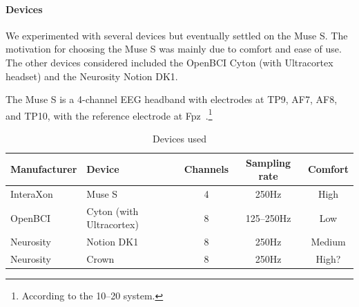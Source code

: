         \paragraph{Devices}

            We experimented with several devices but eventually settled on the Muse S. The motivation for choosing the Muse S was mainly due to comfort and ease of use. The other devices considered included the OpenBCI Cyton (with Ultracortex headset) and the Neurosity Notion DK1.

            The Muse S is a 4-channel EEG headband with electrodes at TP9, AF7, AF8, and TP10, with the reference electrode at Fpz~\cite{krigolson_choosing_2017}.\footnote{According to the 10--20 system.}

            \begin{widepage}
            \begin{table}
                \begin{tabular}{llccc}
                    \toprule
                    Manufacturer
                    & Device
                    & Channels
                    & Sampling rate
                    & Comfort
                    \\ 
                    \midrule
                    InteraXon
                    & Muse S
                    & 4
                    & 250Hz
                    & High \\
                 OpenBCI
                    & Cyton (with Ultracortex)
                    & 8
                    & 125--250Hz
                    & Low \\
                 Neurosity
                    & Notion DK1
                    & 8
                    & 250Hz
                    & Medium \\
                  Neurosity
                    & Crown
                    & 8
                    & 250Hz
                    & High? \\
                    \bottomrule
                \end{tabular}
                \caption{Devices used}\label{table:devices}
            \end{table}
            \end{widepage}

